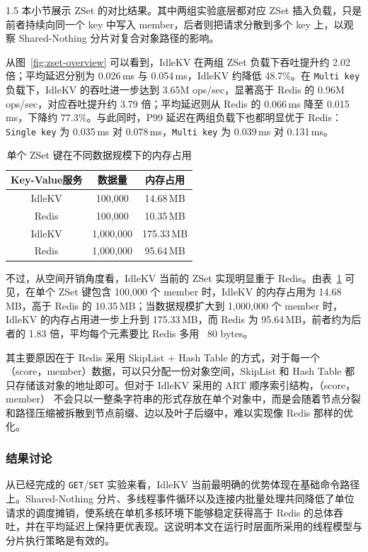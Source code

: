 \documentclass[a4paper,12pt,fontset=none,twoside]{article}
\numberwithin{figure}{section}
\numberwithin{equation}{section}
\numberwithin{table}{section}
\begin{document}
\begin{spacing}{1.5}
	本小节展示 ZSet 的对比结果。其中两组实验底层都对应 ZSet 插入负载，只是前者持续向同一个 key 中写入 member，后者则把请求分散到多个 key 上，以观察 Shared-Nothing 分片对复合对象路径的影响。

	从图~\ref{fig:zset-overview} 可以看到，IdleKV 在两组 ZSet 负载下吞吐提升约 2.02 倍；平均延迟分别为 0.026\,ms 与 0.054\,ms，IdleKV 约降低 48.7\%。在 \texttt{Multi key} 负载下，IdleKV 的吞吐进一步达到 3.65M ops/sec，显著高于 Redis 的 0.96M ops/sec，对应吞吐提升约 3.79 倍；平均延迟则从 Redis 的 0.066\,ms 降至 0.015\,ms，下降约 77.3\%。与此同时，P99 延迟在两组负载下也都明显优于 Redis：\texttt{Single key} 为 0.035\,ms 对 0.078\,ms，\texttt{Multi key} 为 0.039\,ms 对 0.131\,ms。

	\begin{table}[htbp]
		\centering
		\small
		\caption{单个 ZSet 键在不同数据规模下的内存占用}\label{tab:zset-memory}
		\begin{tabular}{ccc}
			\toprule
			Key-Value服务 & 数据量 & 内存占用 \\
			\midrule
			IdleKV & 100{,}000 & 14.68\,MB \\
			Redis & 100{,}000 & 10.35\,MB \\
			IdleKV & 1{,}000{,}000 & 175.33\,MB \\
			Redis & 1{,}000{,}000 & 95.64\,MB \\
			\bottomrule
		\end{tabular}
	\end{table}

	不过，从空间开销角度看，IdleKV 当前的 ZSet 实现明显重于 Redis。由表~\ref{tab:zset-memory} 可见，在单个 ZSet 键包含 100{,}000 个 member 时，IdleKV 的内存占用为 14.68\,MB，高于 Redis 的 10.35\,MB；当数据规模扩大到 1{,}000{,}000 个 member 时，IdleKV 的内存占用进一步上升到 175.33\,MB，而 Redis 为 95.64\,MB，前者约为后者的 1.83 倍，平均每个元素要比 Redis 多用 ~80 bytes。

	其主要原因在于 Redis 采用 SkipList + Hash Table 的方式，对于每一个 （score，member）数据，可以只分配一份对象空间，SkipList 和 Hash Table 都只存储该对象的地址即可。但对于 IdleKV 采用的 ART 顺序索引结构，（score，member） 不会只以一整条字符串的形式存放在单个对象中，而是会随着节点分裂和路径压缩被拆散到节点前缀、边以及叶子后缀中，难以实现像 Redis 那样的优化。

	\subsubsection{结果讨论}
	从已经完成的 \texttt{GET}/\texttt{SET} 实验来看，IdleKV 当前最明确的优势体现在基础命令路径上。Shared-Nothing 分片、多线程事件循环以及连接内批量处理共同降低了单位请求的调度摊销，使系统在单机多核环境下能够稳定获得高于 Redis 的总体吞吐，并在平均延迟上保持更优表现。这说明本文在运行时层面所采用的线程模型与分片执行策略是有效的。


\end{spacing}
\end{document}
